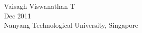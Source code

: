 
\begin{acknowledgements}

\\
\\
\hspace{0in}
Vaisagh Viswanathan T\\
Dec 2011\\
{Nanyang Technological University, Singapore}\\
\end{acknowledgements}
